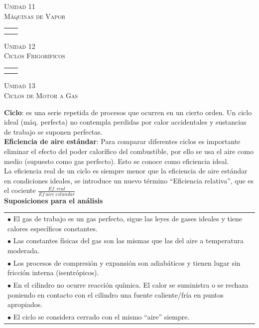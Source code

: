 \documentclass[11pt,a4paper,twocolumn]{article}
\newcommand{\unidad}[2]{\begin{center}
		\fontsize{10}{10}\selectfont\color{gray!50!black}\scshape Unidad #1 \\
		\fontsize{14}{14}\selectfont \scshape #2
\end{center}}
\begin{document}
	\unidad{11}{Máquinas de Vapor}
	
	
	\begin{tabular}{r | l} \vspace{.2cm}
		& \\ \vspace{.2cm}
		& \\ 
		
	\end{tabular}

	\unidad{12}{Ciclos Frigoríficos}

	
	\begin{tabular}{r | l} \vspace{.2cm}
		& \\ \vspace{.2cm}
		& \\ 
	\end{tabular}
	
	
	\unidad{13}{Ciclos de Motor a Gas}	
	\textbf{Ciclo}: es una serie repetida de procesos que ocurren en un cierto orden. Un ciclo ideal (máq. perfecta) no contempla perdidas por calor accidentales y sustancias de trabajo se suponen perfectas.\\
	\textbf{Eficiencia de aire estándar}: Para comparar diferentes ciclos es importante eliminar el efecto del poder calorífico del combustible, por ello se usa el aire como medio (supuesto como gas perfecto). Esto se conoce como eficiencia ideal.\\
	La eficiencia real de un ciclo es siempre menor que la eficiencia de aire estándar en condiciones ideales, se introduce un nuevo término ``Eficiencia relativa'', que es el cociente $\frac{Ef.~real}{Ef~aire~estandar}$\\
	\textbf{Suposiciones para el análisis}\\
	\begin{tabularx}{8cm}{X}
		$\bullet$ El gas de trabajo es un gas perfecto, sigue las leyes de gases ideales y tiene calores específicos constantes.\\
		$\bullet$ Las constantes físicas del gas son las mismas que las del aire a temperatura moderada.\\
		$\bullet$ Los procesos de compresión y expansión son adiabáticos y tienen lugar sin fricción interna (isentrópicos).\\
		$\bullet$ En el cilindro no ocurre reacción química. El calor se suministra o se rechaza poniendo en contacto con el cilindro una fuente caliente/fría en puntos apropiados.\\
		$\bullet$ El ciclo se considera cerrado con el mismo ``aire'' siempre.\\
	\end{tabularx}
	
\end{document}

